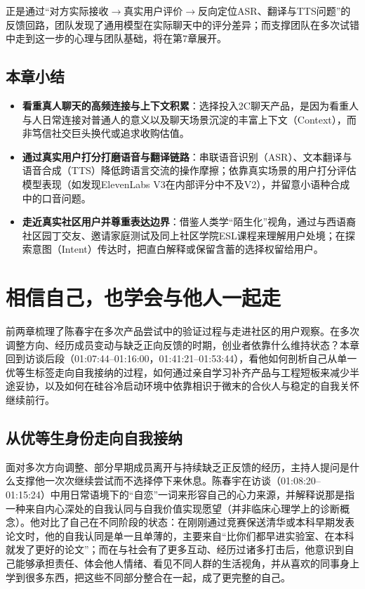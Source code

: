 \documentclass[UTF8,a4paper,11pt,fontset=fandol]{ctexart}
\begin{document}
正是通过“对方实际接收\ensuremath{\rightarrow}真实用户评价\ensuremath{\rightarrow}反向定位ASR、翻译与TTS问题”的反馈回路，团队发现了通用模型在实际聊天中的评分差异；而支撑团队在多次试错中走到这一步的心理与团队基础，将在第7章展开。
\subsection{本章小结}
\begin{itemize}
\item \textbf{看重真人聊天的高频连接与上下文积累}：选择投入2C聊天产品，是因为看重人与人日常连接对普通人的意义以及聊天场景沉淀的丰富上下文（Context），而非笃信社交巨头换代或追求收购估值。
\item \textbf{通过真实用户打分打磨语音与翻译链路}：串联语音识别（ASR）、文本翻译与语音合成（TTS）降低跨语言交流的操作摩擦；依靠真实场景的用户打分评估模型表现（如发现ElevenLabs V3在内部评分中不及V2），并留意小语种合成中的口音问题。
\item \textbf{走近真实社区用户并尊重表达边界}：借鉴人类学“陌生化”视角，通过与西语裔社区园丁交友、邀请家庭测试及同上社区学院ESL课程来理解用户处境；在探索意图（Intent）传达时，把直白解释或保留含蓄的选择权留给用户。
\end{itemize}
\section{相信自己，也学会与他人一起走}
前两章梳理了陈春宇在多次产品尝试中的验证过程与走进社区的用户观察。在多次调整方向、经历成员变动与缺乏正向反馈的时期，创业者依靠什么维持状态？本章回到访谈后段（01:07:44–01:16:00，01:41:21–01:53:44），看他如何剖析自己从单一优等生标签走向自我接纳的过程，如何通过亲自学习补齐产品与工程短板来减少半途妥协，以及如何在硅谷冷启动环境中依靠相识于微末的合伙人与稳定的自我关怀继续前行。
\subsection{从优等生身份走向自我接纳}
面对多次方向调整、部分早期成员离开与持续缺乏正反馈的经历，主持人提问是什么支撑他一次次继续尝试而不选择停下来休息。陈春宇在访谈（01:08:20–01:15:24）中用日常语境下的“自恋”一词来形容自己的心力来源，并解释说那是指一种来自内心深处的自我认同与自我价值实现愿望（并非临床心理学上的诊断概念）。他对比了自己在不同阶段的状态：在刚刚通过竞赛保送清华或本科早期发表论文时，他的自我认同是单一且单薄的，主要来自“比你们都早进实验室、在本科就发了更好的论文”；而在与社会有了更多互动、经历过诸多打击后，他意识到自己能够承担责任、体会他人情绪、看见不同人群的生活视角，并从喜欢的同事身上学到很多东西，把这些不同部分整合在一起，成了更完整的自己。
\end{document}
